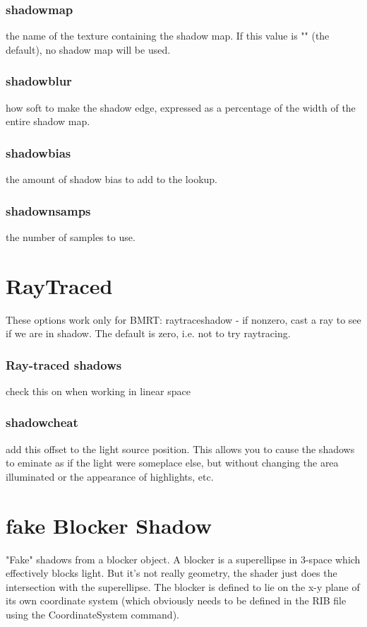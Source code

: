 \documentclass[final,letterpaper,twoside,12pt]{report}
\begin{document}
\subsubsection {shadowmap }
the name of the texture containing the shadow map.  If  this value is "" (the default), no shadow map will be used. 
\smallskip
\subsubsection {shadowblur  }
how soft to make the shadow edge, expressed as a  percentage of the width of the entire shadow map.
\smallskip
\subsubsection {shadowbias  }
the amount of shadow bias to add to the lookup.
\smallskip
\subsubsection {shadownsamps  }
the number of samples to use.
\smallskip
\section {RayTraced}
These options work only for BMRT:   raytraceshadow - if nonzero, cast a ray to see if we are in shadow.  The default is zero, i.e. not to try raytracing.
\subsubsection {Ray-traced shadows}
check this on when working in linear space 
\smallskip
\subsubsection {shadowcheat}
add this offset to the light source position.  This  allows you to cause the shadows to eminate as if the light  were someplace else, but without changing the area  illuminated or the appearance of highlights, etc.
\smallskip
\section {fake Blocker Shadow}
"Fake" shadows from a blocker object.  A blocker is a superellipse in 3-space which effectively blocks light.  But it's not really geometry, the shader just does the intersection with the superellipse.  The blocker is defined to lie on the x-y plane of its own coordinate system (which obviously needs to be defined in the RIB file using the CoordinateSystem command).
\end{document}

